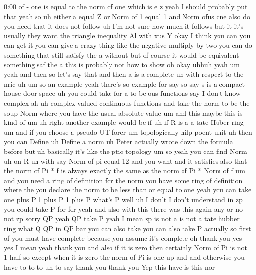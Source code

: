 \begin{unfinished}{0:00}
of  -  one  is  equal  to  the  norm  of  one
which  is  e  z  yeah  I  should  probably  put
that  yeah  so  uh
either  a  equal  Z  or  Norm  of  1  equal  1
and  Norm  ofus  one  also  do  you  need  that
it  does  not
follow  uh  I'm  not  sure  how  much  it
follows  but  it
it's  usually  they  want  the  triangle
inequality  Al  with  xus  Y  okay  I  think
you  can  you  can  get  it  you  can  give  a
crazy  thing  like  the  negative  multiply
by  two  you  can  do  something  that  still
satisfy  the  a  without  but  of  course  it
would  be  equivalent  something  saf  the  a
this  is  probably  not  how  to  show  oh
okay
uhhuh  yeah
um  yeah  and  then  so  let's  say  that  and
then  a  is  a
complete  uh  with  respect
to  the  nric
uh  um  so  an  example  yeah
there's  so  example  for  say  so  say  s  is  a
compact  house  door
space  uh  you  could  take  for  a  to  be  ous
functions  say  I  don't  know  complex  ah  uh
complex  valued  continuous  functions  and
take  the  norm  to  be  the  soup
Norm  where  you  have  the  usual  absolute
value
um  and  this
maybe  this  is  kind
of  um
uh  right  another  example  would  be  if  uh
if  R  is  a  a  tate  Huber
ring  um  and  if  you  choose  a  pseudo  UT
forer
um  topologically  nilp  poent
unit  uh  then  you  can
Define  uh  Define  a  norm  uh  Peter
actually  wrote  down  the  formula  before
but  uh  basically  it's  like  the  ptic
topology  um
so  yeah  you  can  find
Norm  uh  on
R  uh
with  say  Norm  of  pi  equal  12  and  you
want  and  it  satisfies  also  that  the  norm
of  Pi  *  f  is  always  exactly  the  same  as
the  norm  of  Pi  *  Norm  of
f
um  and  you  need  a  ring  of  definition  for
the
norm  you  have  some  ring  of  definition
where  the  you  declare  the  norm  to  be
less  than  or  equal  to  one
yeah  you  can  take  one  plus
P  1  plus  P  1  plus  P  what's
P
well  uh  I  don't  I  don't
understand  in  zp  you  could  take  P  for
for
yeah  and  also  with  this  there  was  this
again  any  or  no  not  zp  sorry  QP  yeah  QP
take  P  yeah  I  mean  zp  is  not  a  is  not  a
tate  hubber  ring  what  Q  QP  in  QP  bar  you
can  also  take  you  can  also  take  P
actually  so  first  of  you  must  have
complete  because  you  assume  it's
complete  oh  thank  you  yes  yes  I  mean
yeah  thank  you  and  also  if  it  is  zero
then  certainly  Norm  of  Pi  is  not  1  half
so  except  when  it  is  zero  the  norm  of  Pi
is  one  up  and  and  otherwise  you  have  to
to  to  uh  to
say  thank  you  thank
you  Yep  this  have  is  this  nor

\end{unfinished}
